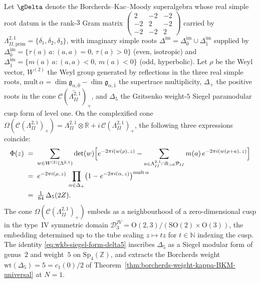 \begin{theorem}
\label{thm:wkb-denominator-delta-5}
Let $\gDelta$ denote the Borcherds--Kac--Moody superalgebra whose
real simple root datum is the rank-$3$ Gram matrix
$\left(\begin{smallmatrix} 2 & -2 & -2 \\ -2 & 2 & -2 \\ -2 & -2 & 2
\end{smallmatrix}\right)$ carried by $\Lambda^{2,1}_{II,\mathrm{prim}}
= \{\delta_1, \delta_2, \delta_3\}$, with imaginary simple roots
$\Delta^{\mathrm{im}} = \Delta^{\mathrm{im}}_{\bar 0} \cup
\Delta^{\mathrm{im}}_{\bar 1}$ supplied by
$\Delta^{\mathrm{im}}_{\bar 0} = \{\tau(a)\,a : (a,a) = 0,\,
\tau(a) > 0\}$ (even, isotropic) and
$\Delta^{\mathrm{im}}_{\bar 1} = \{m(a)\,a : (a,a) < 0,\, m(a) < 0\}$
(odd, hyperbolic). Let $\rho$ be the Weyl vector, $W^{(2)}$ the Weyl
group generated by reflections in the three real simple roots,
$\mathrm{mult}\,\alpha = \dim \mathfrak{g}_{\alpha,\bar 0} -
\dim \mathfrak{g}_{\alpha,\bar 1}$ the supertrace multiplicity,
$\Delta_+$ the positive roots in the cone
$\mathcal{C}(\widetilde{\Lambda^{2,1}_{II}})_+$, and $\Delta_5$
the Gritsenko weight-$5$ Siegel paramodular cusp form of level one.
On the complexified cone
$\Omega(\mathcal{C}(\Lambda^{2,1}_{II})_+) =
\Lambda^{2,1}_{II} \otimes \mathbb{R} + i\,\mathcal{C}(\Lambda^{2,1}_{II})_+$,
the following three expressions coincide:
\begin{align}
\Phi(z) \;&=\; \sum_{w \in W^{(2)}(\Lambda^{2,1})} \det(w)
 \Bigl[ e^{-2\pi i (w(\rho),\,z)}
 - \sum_{a \in \Lambda^{2,1}_{II} \cap \mathbb{R}_{>0}\mathcal{P}_{II}}
 m(a)\, e^{-2\pi i (w(\rho + a),\,z)} \Bigr]
\label{eq:wkb-sum-form-delta5} \\
 &=\; e^{-2\pi i (\rho,\,z)}\,
 \prod_{\alpha \in \Delta_+}
 \bigl(1 - e^{-2\pi i (\alpha,\,z)}\bigr)^{\mathrm{mult}\,\alpha}
\label{eq:wkb-product-form-delta5} \\
 &=\; \tfrac{1}{64}\,\Delta_5(2Z).
\label{eq:wkb-siegel-form-delta5}
\end{align}
The cone $\Omega(\mathcal{C}(\Lambda^{2,1}_{II})_+)$ embeds as a
neighbourhood of a zero-dimensional cusp in the type~IV symmetric domain
$\mathcal{D}^{IV}_3 = \mathrm{O}(2,3)/(\mathrm{SO}(2) \times \mathrm{O}(3))$,
the embedding determined up to the tube scaling $z \mapsto t z$ for
$t \in \mathbb{N}$ indexing the cusp. The identity
\eqref{eq:wkb-siegel-form-delta5} inscribes $\Delta_5$ as a Siegel
modular form of genus~$2$ and weight~$5$ on $\mathrm{Sp}_4(\mathbb{Z})$,
and extracts the Borcherds weight
$\mathrm{wt}(\Delta_5) = 5 = c_1(0)/2$ of
Theorem~\ref{thm:borcherds-weight-kappa-BKM-universal} at $N = 1$.
\end{theorem}

